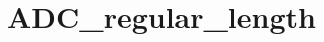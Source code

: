 \hypertarget{group___a_d_c__regular__length}{\section{A\-D\-C\-\_\-regular\-\_\-length}
\label{group___a_d_c__regular__length}
}
